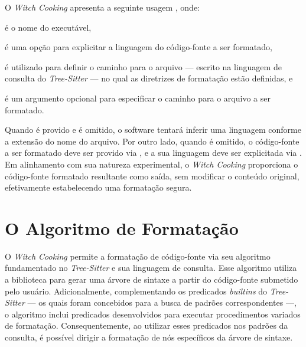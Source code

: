 \documentclass
  [11pt,a4paper,english,brazil,openright,sumario=tradicional,twoside]
  {abntex2}
\newcommand{\treesitter}{\textit{Tree-Sitter}\xspace}
\newcommand{\witchcooking}{\textit{Witch Cooking}\xspace}
\begin{document}
  O \witchcooking apresenta a seguinte usagem
  , onde:
  \begin{inparaenum}
    \item {} é o nome do executável,
    \item \codesnippetinline{[-l LANG]} é uma opção para explicitar a linguagem
          do código-fonte a ser formatado,
    \item {} é utilizado para definir o caminho para
          o arquivo --- escrito na linguagem de consulta do \treesitter{} ---
          no qual as diretrizes de formatação estão definidas, e
    \item \codesnippetinline{[SRC]} é um argumento opcional para especificar o
          caminho para o arquivo a ser formatado.
  \end{inparaenum}
  Quando \codesnippetinline{[SRC]} é provido e \codesnippetinline{[-l LANG]} é
  omitido, o software tentará inferir uma linguagem conforme a extensão do nome
  do arquivo. Por outro lado, quando \codesnippetinline{[SRC]} é omitido, o
  código-fonte a ser formatado deve ser provido via \textit{},
  e a sua linguagem deve ser explicitada via \codesnippetinline{[-l LANG]}. Em
  alinhamento com sua natureza experimental, o \witchcooking proporciona o
  código-fonte formatado resultante como saída, sem modificar o conteúdo
  original, efetivamente estabelecendo uma formatação segura.


  \section{O Algoritmo de Formatação}
  \label{section:fmt-algorithm}

  O \witchcooking permite a formatação de código-fonte via seu algoritmo
  fundamentado no \treesitter e sua linguagem de consulta. Esse algoritmo
  utiliza a biblioteca para gerar uma árvore de sintaxe a partir do
  código-fonte submetido pelo usuário. Adicionalmente, complementando os
  predicados \textit{builtins} do \treesitter{} --- os quais foram concebidos
  para a busca de padrões correspondentes ---, o algoritmo inclui predicados
  desenvolvidos para executar procedimentos variados de formatação.
  Consequentemente, ao utilizar esses predicados nos padrões da consulta, é
  possível dirigir a formatação de nós específicos da árvore de sintaxe.
\end{document}
